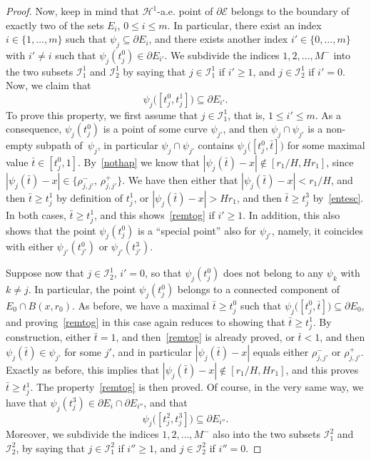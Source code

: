 \documentclass[10pt]{amsart}
\newcommand\E{\mathcal{E}}
\renewcommand\H{\mathcal{H}}
\newcommand\I{\mathcal{I}}
\theoremstyle{plain}
\theoremstyle{definition}
\begin{document}
\begin{proof}
Now, keep in mind that $\H^1$-a.e. point of $\partial\E$ belongs to the boundary of exactly two of the sets $E_i$, $0\leq i \leq m$. In particular, there exist an index $i\in\{1,\dots,m\}$ such that $\psi_j\subseteq \partial E_i$, and there exists another index $i'\in\{0,\dots,m\}$ with $i'\neq i$ such that $\psi_j(t^0_j)\in \partial E_{i'}$. We subdivide the indices $1,2,\dots, M^-$ into the two subsets $\I^1_1$ and $\I^1_2$ by saying that $j\in \I^1_1$ if $i'\geq 1$, and $j\in \I^1_2$ if $i'=0$. Now, we claim that
\begin{equation}\label{remtog}
\psi_j\big( [t^0_j , t^1_j]\big) \subseteq \partial E_{i'}.
\end{equation}
To prove this property, we first assume that $j\in\I^1_1$, that is, $1\leq i' \leq m$. As a con\-se\-quence, $\psi_j(t^0_j)$ is a point of some curve $\psi_{j'}$, and then $\psi_j \cap \psi_{j'}$ is a non-empty subpath of~$\psi_j$, in particular $\psi_j\cap\psi_{j'}$ contains $\psi_j\big( [t^0_j,\bar t] \big)$ for some maximal value $\bar t\in[t^0_j,1]$. By~\eqref{nothap} we know that $|\psi_j(\bar t)-x|\notin [r_1/H,Hr_1]$, since $|\psi_j(\bar t)-x| \in \{\rho^-_{j,j'},\,\rho^+_{j,j'}\}$. We have then either that $|\psi_j(\bar t)-x|<r_1/H$, and then $\bar t\geq t^1_j$ by definition of $t^1_j$, or $|\psi_j(\bar t)-x|>Hr_1$, and then $\bar t\geq t^3_j$ by~\eqref{entesc}. In both cases, $\bar t\geq t^1_j$, and this shows~\eqref{remtog} if $i'\geq 1$. In addition, this also shows that the point $\psi_j(t^0_j)$ is a ``special point'' also for $\psi_{j'}$, namely, it coincides with either $\psi_{j'}(t^0_{j'})$ or $\psi_{j'}(t^3_{j'})$.

Suppose now that $j\in \I^1_2$, \ie $i'=0$, so that $\psi_j(t^0_j)$ does not belong to any $\psi_k$ with $k\neq j$. In particular, the point $\psi_j(t^0_j)$ belongs to a connected component of $E_0\cap B(x,r_0)$. As before, we have a maximal $\bar t\geq t^0_j$ such that $\psi_j\big([t^0_j,\bar t]\big)\subseteq \partial E_0$, and proving~\eqref{remtog} in this case again reduces to showing that $\bar t\geq t^1_j$. By construction, either $\bar t=1$, and then~\eqref{remtog} is already proved, or $\bar t<1$, and then $\psi_j(\bar t)\in \psi_{j'}$ for some $j'$, and in particular $|\psi_j(\bar t)-x|$ equals either $\rho^-_{j,j'}$ or $\rho^+_{j,j'}$. Exactly as before, this implies that $|\psi_j(\bar t)-x|\notin [r_1/H,Hr_1]$, and this proves $\bar t\geq t^1_j$. The property~\eqref{remtog} is then proved. Of course, in the very same way, we have that $\psi_j(t^3_j)\in \partial E_i \cap \partial E_{i''}$, and that
\begin{equation}\label{remtog2}
\psi_j\big( [t^2_j , t^3_j]\big) \subseteq \partial E_{i''}.
\end{equation}
Moreover, we subdivide the indices $1,2,\dots, M^-$ also into the two subsets $\I^2_1$ and $\I^2_2$, by saying that $j\in \I^2_1$ if $i''\geq 1$, and $j \in \I^2_2$ if $i''=0$.


\end{proof}
\end{document}
